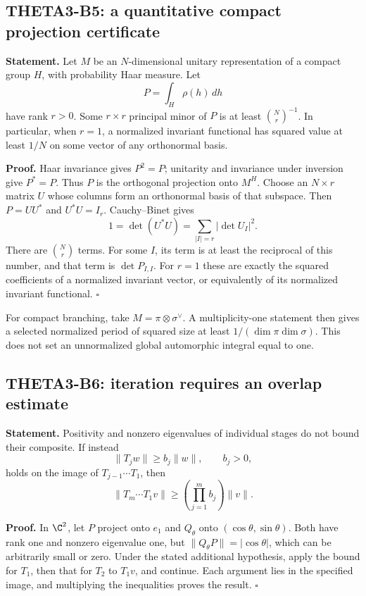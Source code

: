 \subsection{THETA3-B5: a quantitative compact projection certificate}\label{B5}

\textbf{Statement.} Let $M$ be an $N$-dimensional unitary representation of a compact group $H$, with probability Haar measure. Let
\[
 P=\int_H\rho(h)\,dh
\]
have rank $r>0$. Some $r\times r$ principal minor of $P$ is at least $\binom Nr^{-1}$. In particular, when $r=1$, a normalized invariant functional has squared value at least $1/N$ on some vector of any orthonormal basis.

\textbf{Proof.} Haar invariance gives $P^2=P$; unitarity and invariance under inversion give $P^*=P$. Thus $P$ is the orthogonal projection onto $M^H$. Choose an $N\times r$ matrix $U$ whose columns form an orthonormal basis of that subspace. Then $P=UU^*$ and $U^*U=I_r$. Cauchy--Binet gives
\[
 1=\det(U^*U)=\sum_{|I|=r}|\det U_I|^2.
\]
There are $\binom Nr$ terms. For some $I$, its term is at least the reciprocal of this number, and that term is $\det P_{I,I}$. For $r=1$ these are exactly the squared coefficients of a normalized invariant vector, or equivalently of its normalized invariant functional. \hfill$\square$

For compact branching, take $M=\pi\otimes\sigma^\vee$. A multiplicity-one statement then gives a selected normalized period of squared size at least $1/(\dim\pi\dim\sigma)$. This does not set an unnormalized global automorphic integral equal to one.

\subsection{THETA3-B6: iteration requires an overlap estimate}\label{B6}

\textbf{Statement.} Positivity and nonzero eigenvalues of individual stages do not bound their composite. If instead
\[
 \|T_jw\|\geq b_j\|w\|,\qquad b_j>0,
\]
holds on the image of $T_{j-1}\cdots T_1$, then
\[
 \|T_m\cdots T_1v\|\geq\left(\prod_{j=1}^m b_j\right)\|v\|.
\]

\textbf{Proof.} In $\C^2$, let $P$ project onto $e_1$ and $Q_\theta$ onto $(\cos\theta,\sin\theta)$. Both have rank one and nonzero eigenvalue one, but $\|Q_\theta P\|=|\cos\theta|$, which can be arbitrarily small or zero. Under the stated additional hypothesis, apply the bound for $T_1$, then that for $T_2$ to $T_1v$, and continue. Each argument lies in the specified image, and multiplying the inequalities proves the result. \hfill$\square$

